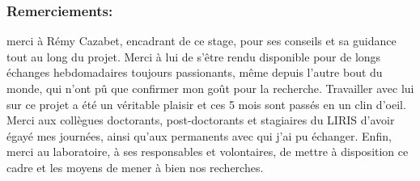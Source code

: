 \documentclass[runningheads]{llncs}
\begin{document}












    
\begin{credits}
\subsubsection{Remerciements:} merci à Rémy Cazabet, encadrant de ce stage, pour ses conseils et sa guidance tout au long du projet. Merci à lui de s'être rendu disponible pour de longs échanges hebdomadaires toujours passionants, même depuis l'autre bout du monde, qui n'ont pû que confirmer mon goût pour la recherche. Travailler avec lui sur ce projet a été un véritable plaisir et ces 5 mois sont passés en un clin d'oeil. Merci aux collègues doctorants, post-doctorants et stagiaires du LIRIS d'avoir égayé mes journées, ainsi qu'aux permanents avec qui j'ai pu échanger. Enfin, merci au laboratoire, à ses responsables et volontaires, de mettre à disposition ce cadre et les moyens de mener à bien nos recherches.
\end{credits}



\newpage


\end{document}
